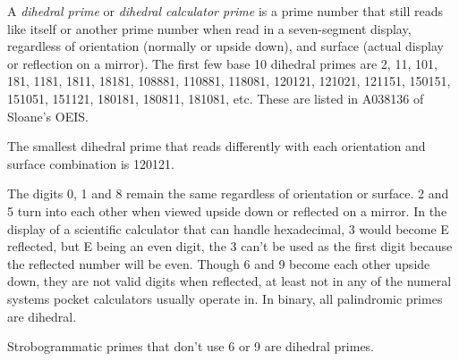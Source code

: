 \documentclass[12pt]{article}
\begin{document}
A {\em dihedral prime} or {\em dihedral calculator prime} is a prime number that still reads like itself or another prime number when read in a seven-segment display, regardless of orientation (normally or upside down), and surface (actual display or reflection on a mirror). The first few base 10 dihedral primes are 2, 11, 101, 181, 1181, 1811, 18181, 108881, 110881, 118081, 120121, 121021, 121151, 150151, 151051, 151121, 180181, 180811, 181081, etc. These are listed in A038136 of Sloane's OEIS.

The smallest dihedral prime that reads differently with each orientation and surface combination is 120121.

The digits 0, 1 and 8 remain the same regardless of orientation or surface. 2 and 5 turn into each other when viewed upside down or reflected on a mirror. In the display of a scientific calculator that can handle hexadecimal, 3 would become E reflected, but E being an even digit, the 3 can't be used as the first digit because the reflected number will be even.
Though 6 and 9 become each other upside down, they are not valid digits when reflected, at least not in any of the numeral systems pocket calculators usually operate in. In binary, all palindromic primes are dihedral.

Strobogrammatic primes that don't use 6 or 9 are dihedral primes.
\end{document}
